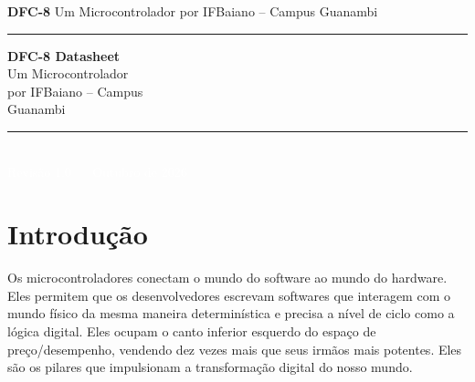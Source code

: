 \documentclass[12pt, a4paper]{article}
\renewcommand{\headrulewidth}{0pt}
\renewcommand{\footrulewidth}{1.3mm}
\begin{document}
	\begin{titlepage}
		\color{white}
		\pagecolor{CorFundo}
		
		\begin{flushleft}
			\noindent \small \textbf{DFC-8} Um Microcontrolador por IFBaiano -- Campus Guanambi \\
			\rule{\linewidth}{1.3mm}
			\vspace{1.5cm}
			
			{\huge \textbf{DFC-8 Datasheet} \\}
			\vspace{0.2cm}
			{\LARGE Um Microcontrolador \\}
			\vspace{0.2cm}
			{\LARGE por IFBaiano -- Campus \\}
			\vspace{0.2cm}
			{\LARGE Guanambi}
			
		 	\vfill
		 	
			{\color{white}\rule{\linewidth}{1.3mm}} \\[0.2cm]
			\textcolor{white}{\small Revisão 1.0 --- Outubro de 2026}
					 	
		\end{flushleft}
	\end{titlepage}
	
	
	\clearpage
	
	\pagecolor{white}
	\color{black}
	
	\pagestyle{sumariostyle}
	\tableofcontents
	\newpage
	\thispagestyle{sumariostyle}
	
	\clearpage

	\pagestyle{fancy}
	
	\fancyhf{}
	\renewcommand{\headrulewidth}{0.4pt}
	\renewcommand{\footrulewidth}{0.4pt}
	
	\section{Introdução}
	Os microcontroladores conectam o mundo do software ao mundo do hardware. Eles permitem que os desenvolvedores escrevam softwares que interagem com o mundo físico da mesma maneira determinística e precisa a nível de ciclo como a lógica digital. Eles ocupam o canto inferior esquerdo do espaço de preço/desempenho, vendendo dez vezes mais que seus irmãos mais potentes. Eles são os pilares que impulsionam a transformação digital do nosso mundo.
	
\end{document}
